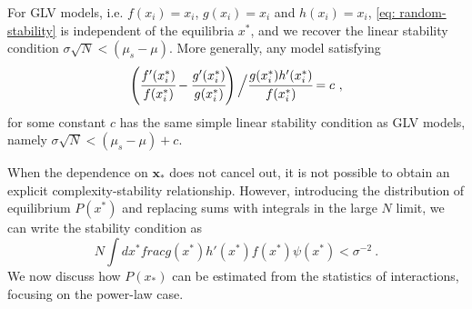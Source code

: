 For GLV models, i.e. $f(x_i)=x_i$, $g(x_i)=x_i$ and $h(x_i)=x_i$, \eqref{eq: random-stability} is independent of the equilibria $x^*$, and we recover the linear stability condition
$\sigma\sqrt{N} < (\mu_s-\mu)$.
More generally, any model satisfying
\begin{equation}\label{eq: equiv class glv}
    \left(\cfrac{f'(x_i^*)}{f(x_i^*)} -
        \cfrac{g'(x_i^*)}{g(x_i^*)}\right)\Bigl /
        \cfrac{g(x_i^*)h'(x_i^*)}{f(x_i^*)} = c \ ,
\end{equation}
for some constant $c$ has the same simple linear stability condition as GLV models, namely $\sigma\sqrt{N} < (\mu_s-\mu) +c$.

When the dependence on $\mathbf{x}_*$ does not cancel out, it is not possible to obtain an explicit complexity-stability relationship. 
However, introducing the distribution of equilibrium $P(x^*)$ and replacing sums with integrals in the large $N$ limit, we can write the stability condition as
\begin{equation}\label{eq: random-stability int}
    N\int dx^* frac{g(x^*)h'(x^*)}{f(x^*)\psi(x^*)} < \sigma^{-2} \ .
\end{equation}
We now discuss how $P(x_*)$ can be estimated from the statistics of interactions, focusing on the power-law case.
